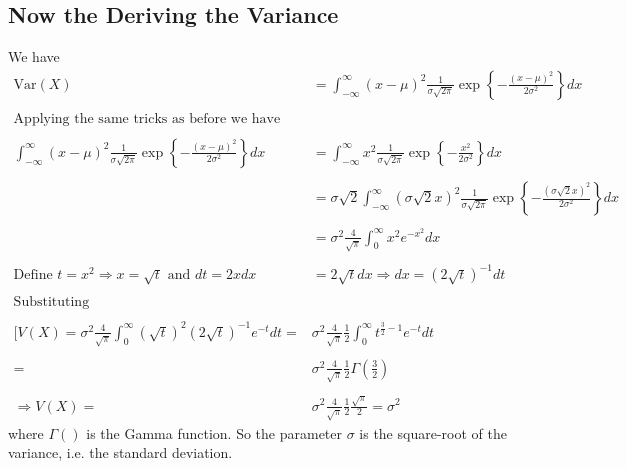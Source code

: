 \documentclass[10pt,a4paper]{article}
\begin{document}
\subsection*{Now the Deriving the Variance}
We have
\begin{align*}
\text {Var}(X) &= \int_{-\infty}^{\infty}(x-\mu)^2\frac{1}{\sigma\sqrt{2\pi}}\exp\left\{-\frac{(x-\mu)^2}{2\sigma^2}\right\}dx\\\\
\textrm{Applying the same tricks as before we have}&\textrm{}\\\\
\int_{-\infty}^{\infty}(x-\mu)^2\frac{1}{\sigma\sqrt{2\pi}}\exp\left\{-\frac{(x-\mu)^2}{2\sigma^2}\right\}dx &= \int_{-\infty}^{\infty}x^2\frac{1}{\sigma\sqrt{2\pi}}\exp\left\{-\frac{x^2}{2\sigma^2}\right\}dx\\\\
&=\sigma \sqrt2\int_{-\infty}^{\infty}(\sigma \sqrt2x)^2\frac{1}{\sigma\sqrt{2\pi}}\exp\left\{-\frac{(\sigma \sqrt2x)^2}{2\sigma^2}\right\}dx \\\\
&= \sigma^2\frac{4}{\sqrt{\pi}}\int_{0}^{\infty}x^2e^{-x^2}dx\\\\
\textrm{Define} \,\,t=x^2\Rightarrow x= \sqrt t\,\,\textrm{and}\,\,dt = 2xdx& = 2\sqrt tdx \Rightarrow dx = (2\sqrt t)^{-1}dt\\\\
\textrm{Substituting}\qquad\qquad\qquad\qquad\qquad& \\\\
[V(X) = \sigma^2\frac{4}{\sqrt{\pi}}\int_{0}^{\infty}(\sqrt t)^2(2\sqrt t)^{-1}e^{-t}dt = &
\sigma^2\frac{4}{\sqrt{\pi}}\frac 12 \int_{0}^{\infty}t^{\frac 32 -1}e^{-t}dt\\\\
= &\sigma^2\frac{4}{\sqrt{\pi}}\frac 12 \Gamma\left(\frac 32\right)\\\\
\Rightarrow V(X) =& \sigma^2\frac{4}{\sqrt{\pi}}\frac 12 \frac {\sqrt \pi}{2} = \sigma^2
\end{align*}
where $\Gamma()$ is the Gamma function. So the parameter $\sigma$ is the square-root of the variance, i.e. the standard deviation.
\end{document}
